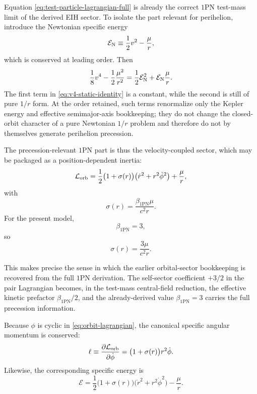 \documentclass[11pt]{article}
\newcommand{\betaPN}{\beta_{\mathrm{1PN}}}
\begin{document}
Equation \eqref{eq:test-particle-lagrangian-full} is already the correct \(1\)PN
test-mass limit of the derived EIH sector. To isolate the part relevant for perihelion,
introduce the Newtonian specific energy
\begin{equation}
\mathcal E_{\rm N}
\equiv
\frac12 v^2-\frac{\mu}{r},
\label{eq:newtonian-specific-energy}
\end{equation}
which is conserved at leading order. Then
\begin{equation}
\frac18 v^4-\frac12\frac{\mu^2}{r^2}
=
\frac12 \mathcal E_{\rm N}^2
+
\mathcal E_{\rm N}\frac{\mu}{r}.
\label{eq:v4-static-identity}
\end{equation}
The first term in \eqref{eq:v4-static-identity} is a constant, while the second is still
of pure \(1/r\) form. At the order retained, such terms renormalize only the Kepler energy
and effective semimajor-axis bookkeeping; they do not change the closed-orbit character of
a pure Newtonian \(1/r\) problem and therefore do not by themselves generate perihelion
precession.

The precession-relevant \(1\)PN part is thus the velocity-coupled sector, which may be
packaged as a position-dependent inertia:
\begin{equation}
\mathcal L_{\rm orb}
=
\frac12\bigl(1+\sigma(r)\bigr)\bigl(\dot r^2+r^2\dot\phi^2\bigr)
+\frac{\mu}{r},
\label{eq:orbit-lagrangian}
\end{equation}
with
\begin{equation}
\sigma(r)=\frac{\betaPN\mu}{c^2 r}.
\label{eq:sigma-def}
\end{equation}
For the present model,
\begin{equation}
\betaPN=3,
\label{eq:beta-three-repeat}
\end{equation}
so
\begin{equation}
\sigma(r)=\frac{3\mu}{c^2 r}.
\label{eq:sigma-three}
\end{equation}

This makes precise the sense in which the earlier orbital-sector bookkeeping is recovered
from the full \(1\)PN derivation. The self-sector coefficient \(+3/2\) in the pair
Lagrangian becomes, in the test-mass central-field reduction, the effective kinetic
prefactor \(\betaPN/2\), and the already-derived value \(\betaPN=3\) carries the full
precession information.

Because \(\phi\) is cyclic in \eqref{eq:orbit-lagrangian}, the canonical specific angular
momentum is conserved:
\begin{equation}
\ell
\equiv
\frac{\partial \mathcal L_{\rm orb}}{\partial \dot\phi}
=
\bigl(1+\sigma(r)\bigr) r^2 \dot\phi.
\label{eq:orbit-angular-momentum}
\end{equation}
Likewise, the corresponding specific energy is
\begin{equation}
\mathcal E
=
\frac12\bigl(1+\sigma(r)\bigr)\bigl(\dot r^2+r^2\dot\phi^2\bigr)
-\frac{\mu}{r}.
\label{eq:orbit-energy}
\end{equation}
\end{document}
